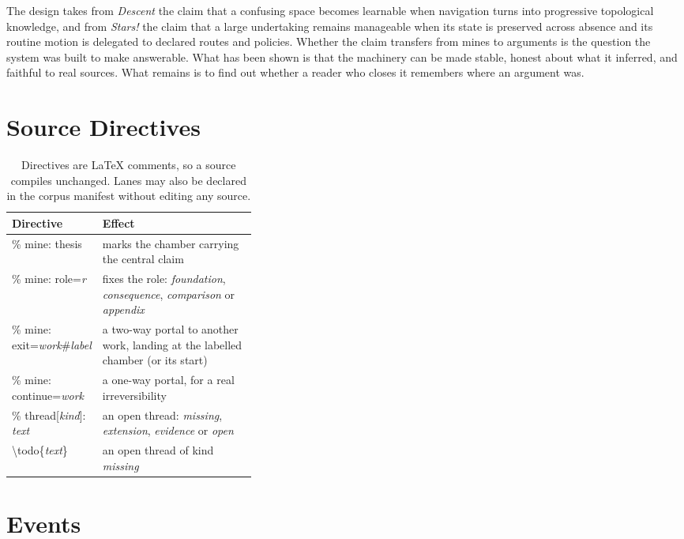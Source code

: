 \documentclass[11pt]{article}
\theoremstyle{remark}
\begin{document}
The design takes from \emph{Descent} the claim that a confusing space becomes learnable when navigation turns into progressive topological knowledge, and from \emph{Stars!} the claim that a large undertaking remains manageable when its state is preserved across absence and its routine motion is delegated to declared routes and policies. Whether the claim transfers from mines to arguments is the question the system was built to make answerable. What has been shown is that the machinery can be made stable, honest about what it inferred, and faithful to real sources. What remains is to find out whether a reader who closes it remembers where an argument was.

\appendix

\section{Source Directives}
\label{app:directives}

\begin{table}[h]
\centering\small
\begin{tabularx}{\linewidth}{>{\ttfamily}p{0.36\linewidth}X}
\toprule
\normalfont Directive & Effect \\
\midrule
\% mine: thesis & marks the chamber carrying the central claim \\
\% mine: role=\emph{r} & fixes the role: \emph{foundation}, \emph{consequence}, \emph{comparison} or \emph{appendix} \\
\% mine: exit=\emph{work}\#\emph{label} & a two-way portal to another work, landing at the labelled chamber (or its start) \\
\% mine: continue=\emph{work} & a one-way portal, for a real irreversibility \\
\% thread[\emph{kind}]: \emph{text} & an open thread: \emph{missing}, \emph{extension}, \emph{evidence} or \emph{open} \\
\textbackslash todo\{\emph{text}\} & an open thread of kind \emph{missing} \\
\bottomrule
\end{tabularx}
\caption{Directives are LaTeX comments, so a source compiles unchanged. Lanes may also be declared in the corpus manifest without editing any source.}
\end{table}

\section{Events}
\label{app:events}
\end{document}
